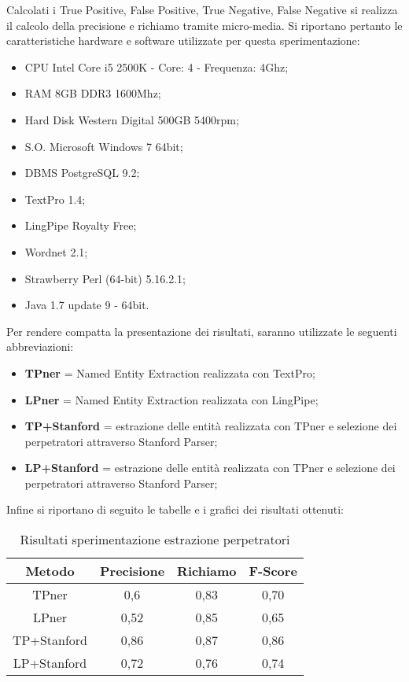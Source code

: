 Calcolati i True Positive, False Positive, True Negative, False Negative si realizza il calcolo della precisione e richiamo tramite micro-media.
Si riportano pertanto le caratteristiche hardware e software utilizzate per questa sperimentazione:
\begin{itemize}
	\item CPU Intel Core i5 2500K - Core: 4 - Frequenza: 4Ghz;
	\item RAM 8GB DDR3 1600Mhz;
	\item Hard Disk Western Digital 500GB 5400rpm;
	\item S.O. Microsoft Windows 7 64bit;
	\item DBMS PostgreSQL 9.2;
	\item TextPro 1.4;
	\item LingPipe Royalty Free;
	\item Wordnet 2.1;
	\item Strawberry Perl (64-bit) 5.16.2.1;
	\item Java 1.7 update 9 - 64bit.
\end{itemize}

Per rendere compatta la presentazione dei risultati, saranno utilizzate le seguenti abbreviazioni:
\begin{itemize}
\item \textbf{TPner} = Named Entity Extraction realizzata con TextPro;
\item \textbf{LPner} = Named Entity Extraction realizzata con LingPipe;
\item \textbf{TP+Stanford} = estrazione delle entità realizzata con TPner e selezione dei perpetratori attraverso Stanford Parser;
\item \textbf{LP+Stanford} = estrazione delle entità realizzata con TPner e selezione dei perpetratori attraverso Stanford Parser;
\end{itemize}
Infine si riportano di seguito le tabelle e i grafici dei risultati ottenuti:
\begin{table}[H]
	\centering
	\footnotesize
	\begin{tabular}{|cccc|}
	\hline
	\textbf{Metodo}  & \textbf{Precisione} & \textbf{Richiamo} & \textbf{F-Score} \\ \hline
	TPner & 0,6 & 0,83 & 0,70\\ 
	LPner & 0,52 & 0,85 & 0,65\\ 
	TP+Stanford & 0,86 & 0,87 & 0,86\\ 
	LP+Stanford & 0,72 & 0,76 & 0,74\\ 
	\hline
	\end{tabular}
	\caption{Risultati sperimentazione estrazione perpetratori}
	\label{tabConfrontoRis}
\end{table}

